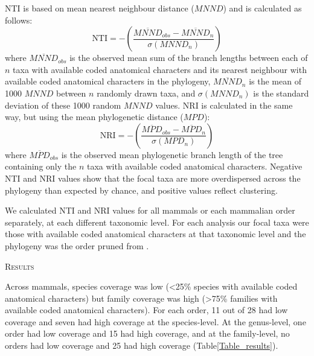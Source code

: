 \documentclass[12pt,letterpaper]{article}
\renewcommand{\section}[1]{%
\bigskip
\begin{center}
\begin{Large}
\normalfont\scshape #1
\medskip
\end{Large}
\end{center}}
\begin{document}
NTI \cite{webb2002phylogenies} is based on mean nearest neighbour distance ($MNND$) and is calculated as follows:
  \begin{equation}
    \text{NTI}=-\left(\frac{\overline{MNND}_{obs}-\overline{MNND}_{n}}{\sigma(MNND_{n})}\right)
  \end{equation}
where $\overline{MNND}_{obs}$ is the observed mean sum of the branch lengths between each of $n$ taxa with available coded anatomical characters and its nearest neighbour with available coded anatomical characters in the phylogeny, 
$\overline{MNND}_{n}$ is the mean of 1000 $MNND$ between $n$ randomly drawn taxa, and $\sigma(MNND_{n})$ is the standard deviation of these 1000 random $MNND$ values.
NRI is calculated in the same way, but using the mean phylogenetic distance ($MPD$):
  \begin{equation}
    \text{NRI}=-\left(\frac{\overline{MPD}_{obs}-\overline{MPD}_{n}}{\sigma(MPD_{n})}\right)
  \end{equation}
where $\overline{MPD}_{obs}$ is the observed mean phylogenetic branch length of the tree containing only the $n$ taxa with available coded anatomical characters.
Negative NTI and NRI values show that the focal taxa are more overdispersed across the phylogeny than expected by chance, and positive values reflect clustering.

We calculated NTI and NRI values for all mammals or each mammalian order separately, at each different taxonomic level. 
For each analysis our focal taxa were those with available coded anatomical characters at that taxonomic level and the phylogeny was the order pruned from \cite{BinindaEmonds}.

%
%


\section{Results}
Across mammals, species coverage was low (\textless 25\% species with available coded anatomical characters) but family coverage was high (\textgreater 75\% families with available coded anatomical characters).
For each order, 11 out of 28 had low coverage and seven had high coverage at the species-level.
At the genus-level, one order had low coverage and 15 had high coverage, and at the family-level, no orders had low coverage and 25 had high coverage (Table\ref{Table_results}).


\end{document}

